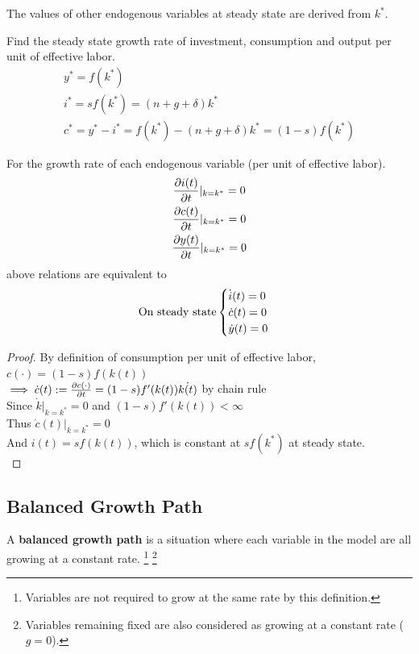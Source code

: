 \documentclass[]{article}
\begin{document}
			\begin{remark}
				The values of other endogenous variables at steady state are derived from $k^*$.
				\begin{example} Find the steady state growth rate of investment, consumption and output per unit of effective labor.
					\begin{gather}
						y^* = f(k^*) \\
						i^* = sf(k^*) = (n+g+\delta) k^* \\
						c^* = y^* - i^* = f(k^*) - (n+g+\delta)k^* = (1-s)f(k^*)
					\end{gather}
				\end{example}
				For the growth rate of each endogenous variable (per unit of effective labor). 
					\begin{gather}
						\frac{\partial{i(t)}}{\partial{t}}|_{k=k^*} = 0 \\
						\frac{\partial{c(t)}}{\partial{t}}|_{k=k^*} = 0 \\
						\frac{\partial{y(t)}}{\partial{t}}|_{k=k^*} = 0 
					\end{gather}
					above relations are equivalent to 
					\begin{gather}
						\text{{On steady state}} \begin{cases}
							\dot{i}(t) = 0 \\
							\dot{c}(t) = 0 \\
							\dot{y}(t) = 0 \\
						\end{cases}
					\end{gather}
			\end{remark}
			
			\begin{proof}
				By definition of consumption per unit of effective labor,\\
				$c(\cdot) = (1-s)f(k(t))$ \\
				$\implies \dot{c}(t) := \frac{\partial{c(\cdot)}}{\partial{t}} = (1-s)f'(k(t)) \dot{k(t)}$ by chain rule \\
				Since $\dot{k}|_{k=k^*} = 0$ and $(1-s)f'(k(t)) < \infty$ \\
				Thus $\dot{c}(t)|_{k=k^*} = 0$ \\
				And $i(t) = sf(k(t))$, which is constant at $sf(k^*)$ at steady state. \\
			\end{proof}
			
		\subsection{Balanced Growth Path}
			\begin{definition}
				A \textbf{balanced growth path} is a situation where each variable in the model are all growing at a constant rate. \footnote{Variables are not required to grow at the same rate by this definition.} \footnote{Variables remaining fixed are also considered as growing at a constant rate ($g=0$).}
			\end{definition}
			
\end{document}

